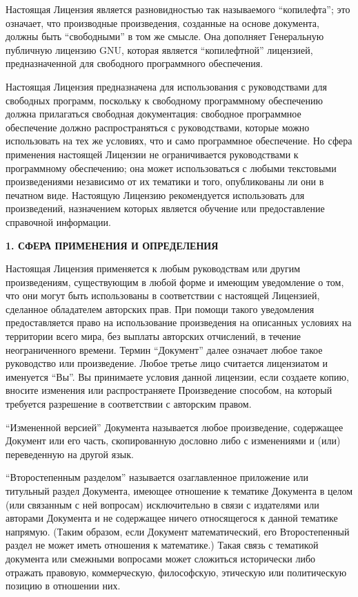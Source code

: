 Настоящая Лицензия является разновидностью так называемого
\enquote{копилефта}; это означает, что производные произведения,
созданные на основе документа, должны быть \enquote{свободными} в том
же смысле. Она дополняет Генеральную публичную лицензию GNU, которая
является \enquote{копилефтной} лицензией, предназначенной для
свободного программного обеспечения.

Настоящая Лицензия предназначена для использования с руководствами для
свободных программ, поскольку к свободному программному обеспечению
должна прилагаться свободная документация: свободное программное
обеспечение должно распространяться с руководствами, которые можно
использовать на тех же условиях, что и само программное
обеспечение. Но сфера применения настоящей Лицензии не ограничивается
руководствами к программному обеспечению; она может использоваться с
любыми текстовыми произведениями независимо от их тематики и того,
опубликованы ли они в печатном виде. Настоящую Лицензию рекомендуется
использовать для произведений, назначением которых является обучение
или предоставление справочной информации.

\begin{center}
{\Large\bf 1. СФЕРА ПРИМЕНЕНИЯ И ОПРЕДЕЛЕНИЯ\par}
\end{center}

Настоящая Лицензия применяется к любым руководствам или другим
произведениям, существующим в любой форме и имеющим уведомление о том,
что они могут быть использованы в соответствии с настоящей Лицензией,
сделанное обладателем авторских прав. При помощи такого уведомления
предоставляется право на использование произведения на описанных
условиях на территории всего мира, без выплаты авторских отчислений, в
течение неограниченного времени. Термин \enquote{Документ} далее
означает любое такое руководство или произведение. Любое третье лицо
считается лицензиатом и именуется \enquote{Вы}. Вы принимаете условия
данной лицензии, если создаете копию, вносите изменения или
распространяете Произведение способом, на который требуется разрешение
в соответствии с авторским правом.

\enquote{Измененной версией} Документа называется любое произведение,
содержащее Документ или его часть, скопированную дословно либо с
изменениями и (или) переведенную на другой язык.

\enquote{Второстепенным разделом} называется озаглавленное приложение
или титульный раздел Документа, имеющее отношение к тематике Документа
в целом (или связанным с ней вопросам) исключительно в связи с
издателями или авторами Документа и не содержащее ничего относящегося
к данной тематике напрямую. (Таким образом, если Документ
математический, его Второстепенный раздел не может иметь отношения к
математике.) Такая связь с тематикой документа или смежными вопросами
может сложиться исторически либо отражать правовую, коммерческую,
философскую, этическую или политическую позицию в отношении них.

